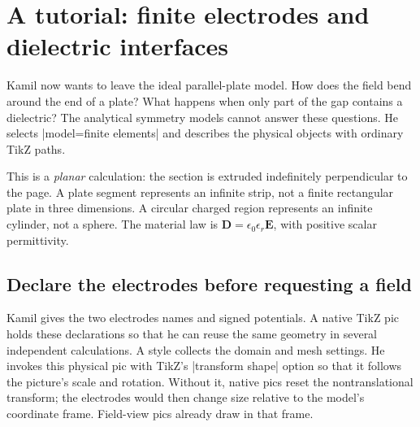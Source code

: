 \section{A tutorial: finite electrodes and dielectric interfaces}
\label{sec:tutorial-electric-fe}

Kamil now wants to leave the ideal parallel-plate model. How does the field
bend around the end of a plate? What happens when only part of the gap contains
a dielectric? The analytical symmetry models cannot answer these questions.
He selects |model=finite elements| and describes the physical objects with
ordinary TikZ paths.

This is a \emph{planar} calculation: the section is extruded indefinitely
perpendicular to the page. A plate segment represents an infinite strip, not
a finite rectangular plate in three dimensions. A circular charged region
represents an infinite cylinder, not a sphere. The material law is
$\mathbf D=\epsilon_0\epsilon_r\mathbf E$, with positive scalar permittivity.

\subsection{Declare the electrodes before requesting a field}
Kamil gives the two electrodes names and signed potentials. A native TikZ pic
holds these declarations so that he can reuse the same geometry in several
independent calculations. A style collects the domain and mesh settings.
He invokes this physical pic with TikZ's |transform shape| option so that it
follows the picture's scale and rotation. Without it, native pics reset the
nontranslational transform; the electrodes would then change size relative to
the model's coordinate frame. Field-view pics already draw in that frame.

\begin{codeexample}
\usetikzlibrary{backgrounds}
\end{codeexample}


